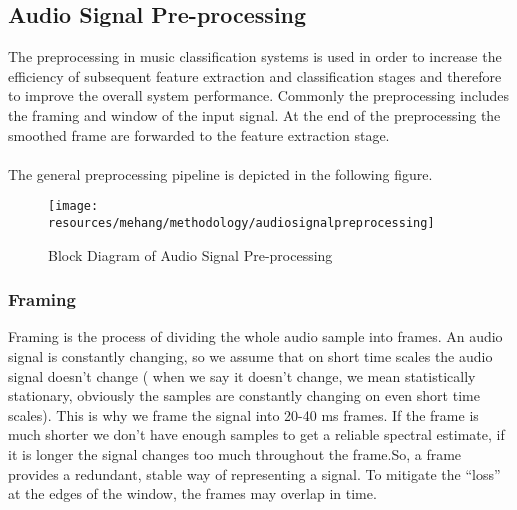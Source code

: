 \subsection{Audio Signal Pre-processing}
The preprocessing in music classification systems is used in order to increase the efficiency of subsequent feature extraction and classification stages and therefore to improve the overall system performance. Commonly the preprocessing includes the framing and window of the input signal. At the end of the preprocessing the smoothed frame are forwarded to the feature extraction stage.\\ 
\\
The general preprocessing pipeline is depicted in the following figure.
\begin{figure}[h!]
        \centering
        \texttt{[image: resources/mehang/methodology/audiosignalpreprocessing]}
        \caption{Block Diagram of Audio Signal Pre-processing}
\end{figure}

\subsubsection{Framing}
Framing is the process of dividing the whole audio sample into frames. An audio signal is constantly changing, so we assume that on short time scales the audio signal doesn’t change ( when we say it doesn’t change, we mean statistically stationary, obviously the samples are constantly changing on even short time scales). This is why we frame the signal into 20-40 ms frames. If the frame is much shorter we don’t have enough samples to get a reliable spectral estimate, if it is longer the signal changes too much throughout the frame.So, a frame provides a redundant, stable way of representing a signal.
To mitigate the “loss” at the edges of the window, the frames may overlap in time.

